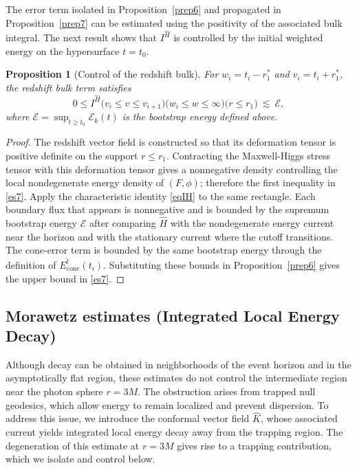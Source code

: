 \documentclass[11pt]{article}
\numberwithin{equation}{section}
\theoremstyle{plain}
\newtheorem{proposition}[theorem]{Proposition}
\theoremstyle{definition}
\theoremstyle{remark}
\begin{document}
The error term isolated in Proposition~\ref{prep6} and propagated in Proposition~\ref{prep7} can be estimated using the positivity of the associated bulk integral. The next result shows that $I^{\hat H}$ is controlled by the initial weighted energy on the hypersurface $t=t_0$.
\begin{proposition}[Control of the redshift bulk]\label{prep8}
For $w_i=t_i-r_1^{\ast}$ and $v_i=t_i+r_1^{\ast}$, the redshift bulk term satisfies
\begin{equation}\label{es7}
0\le I^{\hat H}\bigl(v_i\le v\le v_{i+1}\bigr)\bigl(w_i\le w\le \infty\bigr)\bigl(r\le r_1\bigr)
\ \lesssim\ \mathcal{E},
\end{equation}
where $\mathcal{E}=\sup_{t\ge t_0}\mathcal{E}_k(t)$ is the bootstrap energy defined above.
\end{proposition}

\begin{proof}
The redshift vector field is constructed so that its deformation tensor is positive definite on the support $r\le r_1$.  Contracting the Maxwell-Higgs stress tensor with this deformation tensor gives a nonnegative density controlling the local nondegenerate energy density of $(F,\phi)$; therefore the first inequality in \eqref{es7}.  Apply the characteristic identity \eqref{eqIH} to the same rectangle.  Each boundary flux that appears is nonnegative and is bounded by the supremum bootstrap energy $\mathcal E$ after comparing $\hat H$ with the nondegenerate energy current near the horizon and with the stationary current where the cutoff transitions.  The cone-error term is bounded by the same bootstrap energy through the definition of $E^{\hat t}_{\mathrm{cone}}(t_i)$.  Substituting these bounds in Proposition~\ref{prep6} gives the upper bound in \eqref{es7}.
\end{proof}



\subsection{Morawetz estimates (Integrated Local Energy Decay)}
\label{sec:Morawetz}
Although decay can be obtained in neighborhoods of the event horizon and in the asymptotically flat region, these estimates do not control the intermediate region near the photon sphere \( r = 3M \). The obstruction arises from trapped null geodesics, which allow energy to remain localized and prevent dispersion. To address this issue, we introduce the conformal vector field \( {\hat{K}} \), whose associated current yields integrated local energy decay away from the trapping region. The degeneration of this estimate at \( r = 3M \) gives rise to a trapping contribution, which we isolate and control below.
\end{document}
